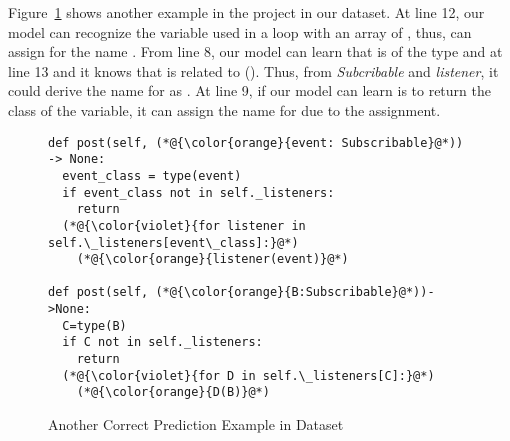 Figure~\ref{example2} shows another example in the project
 in our dataset. At line 12, our model can recognize
the variable  used in a  loop with an array of
, thus, can assign for  the name
. From line 8, our model can learn that  is of
the type  and at line 13 and it knows that 
is related to  (). Thus, from {\em Subcribable}
and \emph{listener}, it could derive the name for  as
. At line 9, if our model can learn  is to
return the class of the variable, it can assign the name
 for  due to the assignment.

\begin{figure}[t]
	\centering {} \begin{lstlisting}[]
def post(self, (*@{\color{orange}{event: Subscribable}@*)) -> None:
  event_class = type(event)
  if event_class not in self._listeners:
    return
  (*@{\color{violet}{for listener in self.\_listeners[event\_class]:}@*)
    (*@{\color{orange}{listener(event)}@*)

def post(self, (*@{\color{orange}{B:Subscribable}@*))->None:
  C=type(B)
  if C not in self._listeners:
    return
  (*@{\color{violet}{for D in self.\_listeners[C]:}@*)
    (*@{\color{orange}{D(B)}@*)
\end{lstlisting}
\vspace{-16pt}
\caption{Another Correct Prediction Example in Dataset}
\label{example2}
\end{figure}
